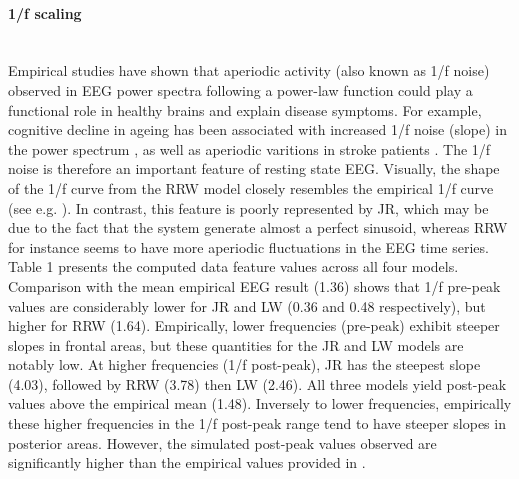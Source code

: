 \documentclass[12pt,twoside]{article}
\begin{document}
\paragraph{1/f scaling} ~\\
Empirical studies have shown that aperiodic activity (also known as 1/f noise) observed in EEG power spectra following a power-law function could play a functional role in healthy brains and explain disease symptoms. For example, cognitive decline in ageing has been associated with increased 1/f noise (slope) in the power spectrum \citep{voytek2015age}, as well as aperiodic varitions in stroke patients \citep{johnston2023spectral}.
The 1/f noise is therefore an important feature of resting state EEG. Visually, the shape of the 1/f curve from the RRW model closely resembles the empirical 1/f curve (see e.g. \citet{freeman2003spatial, dehghani2010comparative}). In contrast, this feature is poorly represented by JR, which may be due to the fact that the system generate almost a perfect sinusoid, whereas RRW for instance seems to have more aperiodic fluctuations in the EEG time series.\\
Table 1 presents the computed data feature values across all four models. Comparison with the mean empirical EEG result (1.36) shows that 1/f pre-peak values are considerably lower for JR and LW (0.36 and 0.48 respectively), but higher for RRW (1.64). Empirically, lower frequencies (pre-peak) exhibit steeper slopes in frontal areas, but these quantities for the JR and LW models are notably low.
At higher frequencies (1/f post-peak), JR has the steepest slope (4.03), followed by RRW (3.78) then LW (2.46). All three models yield post-peak values above the empirical mean (1.48). Inversely to lower frequencies, empirically these higher frequencies in the 1/f post-peak range tend to have steeper slopes in posterior areas. However, the simulated post-peak values observed are significantly higher than the empirical values provided in \citet{muthukumaraswamy20181}.
\end{document}
